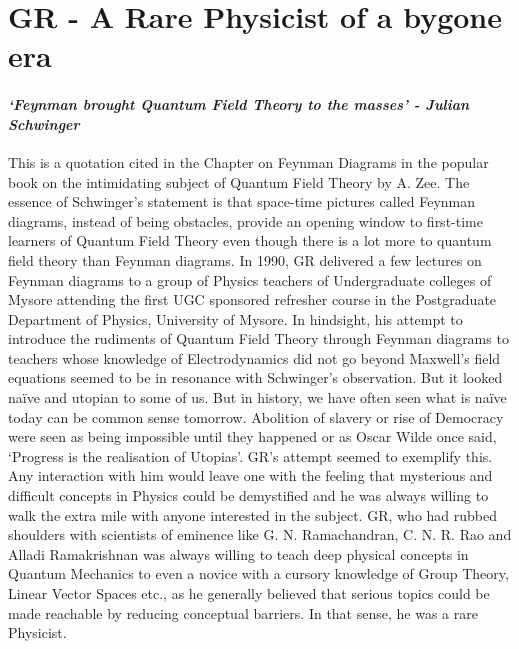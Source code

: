 \chapter{GR - A Rare Physicist of a bygone era}\label{chap15}


\subsubsection*{\textit{`Feynman brought Quantum Field Theory to the masses' - Julian Schwinger}}

This is a quotation cited in the Chapter on Feynman Diagrams in the popular book on the intimidating subject of Quantum Field Theory by A. Zee. The essence of Schwinger's statement is that space-time pictures called Feynman diagrams, instead of being obstacles, provide an opening window to first-time learners of Quantum Field Theory even though there is a lot more to quantum field theory than Feynman diagrams. In 1990, GR delivered a few lectures on Feynman diagrams to a group of Physics teachers of Undergraduate colleges of Mysore attending the first UGC sponsored refresher course in the Postgraduate Department of Physics, University of Mysore. In hindsight, his attempt to introduce the rudiments of Quantum Field Theory through Feynman diagrams to teachers whose knowledge of Electrodynamics did not go beyond Maxwell's field equations seemed to be in resonance with Schwinger's observation. But it looked na\"{i}ve and utopian to some of us. But in history, we have often seen what is na\"{i}ve today can be common sense tomorrow. Abolition of slavery or rise of Democracy were seen as being impossible until they happened or as Oscar Wilde once said, `Progress is the realisation of Utopias'. GR's attempt seemed to exemplify this. Any interaction with him would leave one with the feeling that mysterious and difficult concepts in Physics could be demystified and he was always willing to walk the extra mile with anyone interested in the subject. GR, who had rubbed shoulders with scientists of eminence like G. N. Ramachandran, C. N. R. Rao and Alladi Ramakrishnan was always willing to teach deep physical concepts in Quantum Mechanics to even a novice with a cursory knowledge of Group Theory,  Linear Vector Spaces etc., as he generally believed that serious topics could be made reachable by reducing conceptual barriers. In that sense, he was a rare Physicist.

